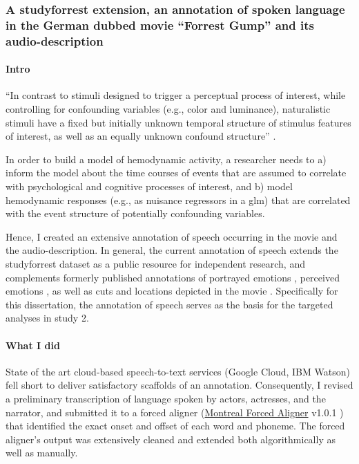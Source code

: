 \subsubsection{A studyforrest extension, an annotation of spoken language in the
German dubbed movie ``Forrest Gump'' and its audio-description}


\paragraph{Intro}


``In contrast to stimuli designed to trigger a perceptual process of interest,
while controlling for confounding variables (e.g., color and luminance),
naturalistic stimuli have a fixed but initially unknown temporal structure of
stimulus features of interest, as well as an equally unknown confound
structure'' \citep{haeusler2021speechanno}.

%
In order to build a model of hemodynamic activity, a researcher needs to a)
inform the model about the time courses of events that are assumed to correlate
with psychological and cognitive processes of interest, and b) model hemodynamic
responses (e.g., as nuisance regressors in a \ac{glm}) that are correlated with
the event structure of potentially confounding variables.

%
Hence, I created an extensive annotation of speech occurring in the movie and
the audio-description.
%
In general, the current annotation of speech extends the studyforrest dataset
as a public resource for independent research, and complements formerly
published annotations of portrayed emotions \citep{labs2015portrayed}, perceived
emotions \citep{lettieri2019emotionotopy}, as well as cuts and locations
depicted in the movie \citep{haeusler2016cutanno}.
%
Specifically for this dissertation, the annotation of speech serves as the basis
for the targeted analyses in study 2.


\paragraph{What I did}
State of the art cloud-based speech-to-text services (Google Cloud, IBM Watson)
fell short to deliver satisfactory scaffolds of an annotation.
Consequently, I revised a preliminary transcription of language spoken by
actors, actresses, and the narrator, and submitted it to a forced aligner
(\href{https://github.com/MontrealCorpusTools/Montreal-Forced-Aligner}{Montreal
Forced Aligner} v1.0.1 \citep{mcauliffe2017montreal}) that identified the exact
onset and offset of each word and phoneme. The forced aligner's output was
extensively cleaned and extended both algorithmically as well as manually.


